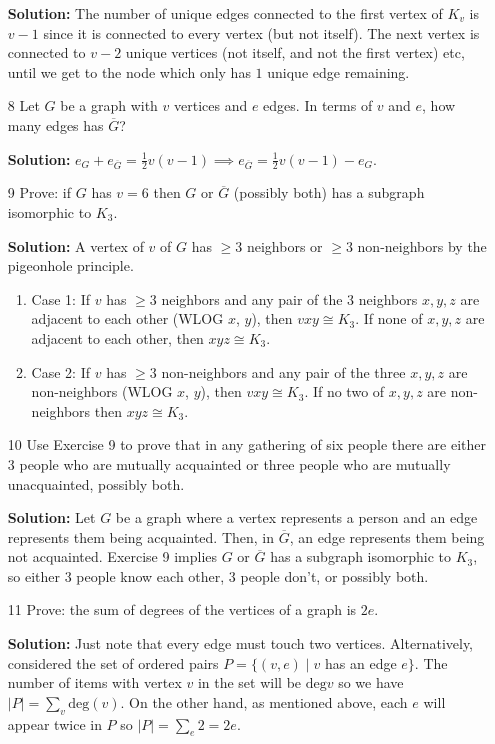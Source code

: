 \documentclass{article}
\newcommand\abs[1]{\left|#1\right|}
\begin{document}
\begin{enumerate}
\textbf{Solution:} The number of unique edges connected to the first vertex of $K_v$ is $v - 1$ since it is connected to every vertex (but not itself). The next vertex is connected to $v - 2$ unique vertices (not itself, and not the first vertex) etc, until we get to the node which only has $1$ unique edge remaining.

\item[8] Let $G$ be a graph with $v$ vertices and $e$ edges. In terms of $v$ and $e$, how many edges has $\overline{G}$?

\textbf{Solution:} $e_G + e_{\overline{G}} = \frac{1}{2}v(v-1) \implies e_{\overline{G}} = \frac{1}{2}v(v-1) - e_G$.

\item[9] Prove: if $G$ has $v = 6$ then $G$ or $\overline{G}$ (possibly both) has a subgraph isomorphic to $K_3$.

\textbf{Solution:} A vertex of $v$ of $G$ has $\geq 3$ neighbors or $\geq 3$ non-neighbors by the pigeonhole principle.
\begin{enumerate}
	\item{Case 1:} If $v$ has $\geq 3$ neighbors and any pair of the $3$ neighbors $x, y, z$ are adjacent to each other (WLOG $x$, $y$), then $vxy \cong K_3$. If none of $x, y, z$ are adjacent to each other, then $xyz \cong K_3$.
    \item{Case 2:} If $v$ has $\geq 3$ non-neighbors and any pair of the three $x, y, z$ are non-neighbors (WLOG $x$, $y$), then $vxy \cong K_3$. If no two of $x, y, z$ are non-neighbors then $xyz \cong K_3$.
\end{enumerate}

\item[10] Use Exercise 9 to prove that in any gathering of six people there are either 3 people who are mutually acquainted or three people who are mutually unacquainted, possibly both.

\textbf{Solution:} Let $G$ be a graph where a vertex represents a person and an edge represents them being acquainted. Then, in $\overline{G}$, an edge represents them being not acquainted. Exercise 9 implies $G$ or $\overline{G}$ has a subgraph isomorphic to $K_3$, so either $3$ people know each other, $3$ people don't, or possibly both.

\item[11] Prove: the sum of degrees of the vertices of a graph is $2e$.

\textbf{Solution:} Just note that every edge must touch two vertices. Alternatively, considered the set of ordered pairs $P = \{(v, e) \mid v$ has an edge $e\}$. The number of items with vertex $v$ in the set will be $\mathrm{deg}{v}$ so we have $\abs{P} = \sum_v{\mathrm{deg}(v)}$. On the other hand, as mentioned above, each $e$ will appear twice in $P$ so $\abs{P} = \sum_e{2} = 2e$.


\end{enumerate}
\end{document}
